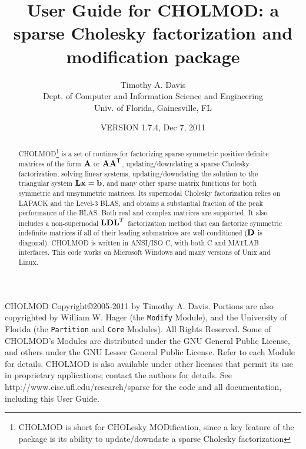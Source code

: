 \documentclass[11pt]{article}
\newcommand{\m}[1]{{\bf{#1}}}       %
\newcommand{\tr}{^{\sf T}}          %
\begin{document}
\author{Timothy A. Davis \\
Dept. of Computer and Information Science and Engineering \\
Univ. of Florida, Gainesville, FL}
\title{User Guide for CHOLMOD: a sparse Cholesky factorization and
modification package}

\date{VERSION 1.7.4, Dec 7, 2011}
\maketitle

\begin{abstract}
    CHOLMOD\footnote{CHOLMOD is short for CHOLesky MODification,
    since a key feature of the package is its ability to update/downdate
    a sparse Cholesky factorization}
    is a set of routines for factorizing sparse symmetric positive
    definite matrices of the form $\m{A}$ or $\m{AA}\tr$, updating/downdating
    a sparse Cholesky factorization, solving linear systems, updating/downdating
    the solution to the triangular system $\m{Lx}=\m{b}$, and many other sparse
    matrix functions for both symmetric and unsymmetric matrices.
    Its supernodal Cholesky factorization
    relies on LAPACK and the Level-3 BLAS, and obtains a substantial fraction
    of the peak performance of the BLAS.  Both real and complex matrices
    are supported.  
    It also includes a non-supernodal $\m{LDL}^T$ factorization method
    that can factorize symmetric indefinite matrices if all of their
    leading submatrices are well-conditioned ($\m{D}$ is diagonal).
    CHOLMOD is written in ANSI/ISO C, with both
    C and MATLAB interfaces.  This code works on Microsoft Windows and many versions
    of Unix and Linux.
\end{abstract}

CHOLMOD Copyright\copyright 2005-2011 by Timothy A. Davis.  Portions are also
copyrighted by William W. Hager (the {\tt Modify} Module),
and the University of Florida (the {\tt Partition} and {\tt Core} Modules).
All Rights Reserved.  Some of CHOLMOD's Modules are distributed under the GNU
General Public License, and others under the GNU Lesser General Public License.
Refer to each Module for details.
CHOLMOD is also available under other licenses that permit its use in
proprietary applications; contact the authors for details.
See http://www.cise.ufl.edu/research/sparse for the code and all documentation,
including this User Guide.
\end{document}
